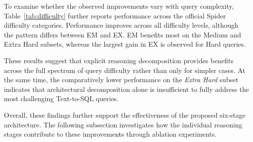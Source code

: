 \documentclass{svproc}
\begin{document}
To examine whether the observed improvements vary with query complexity, Table~\ref{tab:difficulty} further reports performance across the official Spider difficulty categories. Performance improves across all difficulty levels, although the pattern differs between EM and EX. EM benefits most on the Medium and Extra Hard subsets, whereas the largest gain in EX is observed for Hard queries.




These results suggest that explicit reasoning decomposition provides benefits across the full spectrum of query difficulty rather than only for simpler cases. At the same time, the comparatively lower performance on the \textit{Extra Hard} subset indicates that architectural decomposition alone is insufficient to fully address the most challenging Text-to-SQL queries.


Overall, these findings further support the effectiveness of the proposed six-stage architecture. The following subsection investigates how the individual reasoning stages contribute to these improvements through ablation experiments.


\end{document}
